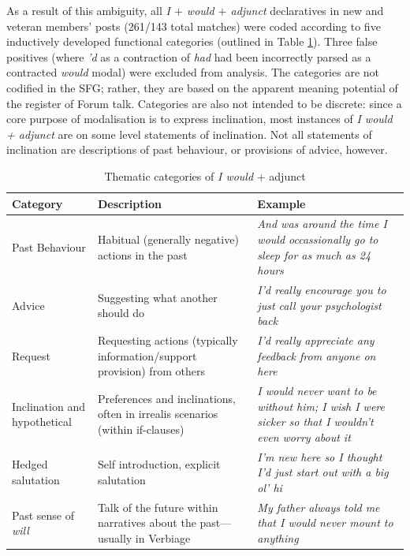 As a result of this ambiguity, all \emph{I $+$ would $+$ adjunct} declaratives in new and veteran \glspl{member}' \glspl{post} (261\slash 143 total matches) were coded according to five inductively developed functional categories (outlined in Table \ref{tab:themcodes}). Three false positives (where \emph{'d} as a contraction of \emph{had} had been incorrectly parsed as a contracted \emph{would} modal) were excluded from analysis. The categories are not codified in the \gls{SFG}; rather, they are based on the apparent meaning potential of the register of \gls{Forum} talk. Categories are also not intended to be discrete: since a core purpose of modalisation is to express inclination, most instances of \emph{I would + adjunct} are on some level statements of inclination. Not all statements of inclination are descriptions of past behaviour, or provisions of advice, however.


   
\begin{table}[htb]
    \centering
    \footnotesize
    \begin{tabularx}{\textwidth}{p{2cm}XX}
    
    \toprule
    Category    & Description & Example       \\ \midrule
    Past Behaviour       & Habitual (generally negative) actions in the past   & \emph{And was around the time I would occassionally go to sleep for as much as 24 hours}     \\ 
    Advice       & Suggesting what another should do & \emph{I'd really encourage you to just call your psychologist back}    \\ 
    Request     & Requesting actions (typically information\slash support provision) from others      & \emph{I'd really appreciate any feedback from anyone on here}          \\
    Inclination and hypothetical & Preferences and inclinations, often in irrealis scenarios (within if-clauses) & \emph{I would never want to be without him; I wish I were sicker so that I wouldn't even worry about it} \\ 
    Hedged salutation            & Self introduction, explicit salutation      & \emph{I'm new here so I thought I'd just start out with a big ol' hi} \\ 
    Past sense of \emph{will}           & Talk of the future within narratives about the past---usually in Verbiage     & \emph{My father always told me that I would never mount to anything}   \\ \bottomrule
    \end{tabularx}
    \caption{Thematic categories of \emph{I would} + adjunct}
    \label{tab:themcodes}
    \end{table}
                    
